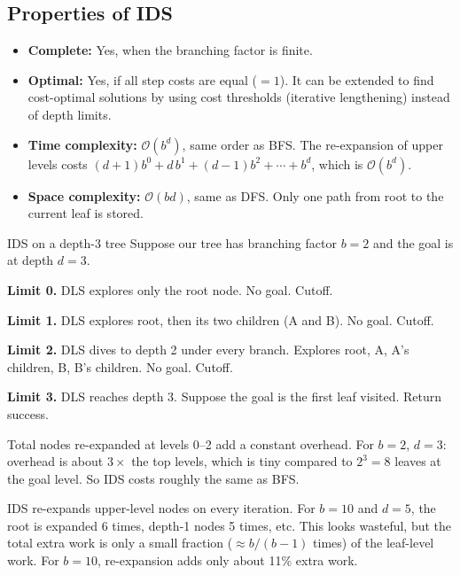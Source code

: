 \documentclass[a4paper,11pt]{article}
\begin{document}
\subsection*{Properties of IDS}

\begin{itemize}
  \item \textbf{Complete:} Yes, when the branching factor is finite.
  \item \textbf{Optimal:} Yes, if all step costs are equal ($=1$). It can be
    extended to find cost-optimal solutions by using cost thresholds
    (iterative lengthening) instead of depth limits.
  \item \textbf{Time complexity:} $\mathcal{O}(b^{d})$, same order as BFS.
    The re-expansion of upper levels costs
    $(d+1)b^{0} + d\,b^{1} + (d-1)b^{2} + \cdots + b^{d}$, which is
    $\mathcal{O}(b^{d})$.
  \item \textbf{Space complexity:} $\mathcal{O}(bd)$, same as DFS. Only one
    path from root to the current leaf is stored.
\end{itemize}

\begin{worked}{IDS on a depth-3 tree}
Suppose our tree has branching factor $b=2$ and the goal is at depth $d=3$.
\begin{steps}
  \item \textbf{Limit 0.} DLS explores only the root node. No goal. Cutoff.
  \item \textbf{Limit 1.} DLS explores root, then its two children (A and B).
    No goal. Cutoff.
  \item \textbf{Limit 2.} DLS dives to depth 2 under every branch. Explores
    root, A, A's children, B, B's children. No goal. Cutoff.
  \item \textbf{Limit 3.} DLS reaches depth 3. Suppose the goal is the first
    leaf visited. Return success.
\end{steps}
Total nodes re-expanded at levels 0--2 add a constant overhead. For $b=2$,
$d=3$: overhead is about $3 \times$ the top levels, which is tiny compared to
$2^{3}=8$ leaves at the goal level. So IDS costs roughly the same as BFS.
\end{worked}

\begin{watchout}
IDS re-expands upper-level nodes on every iteration. For $b=10$ and $d=5$,
the root is expanded 6 times, depth-1 nodes 5 times, etc. This looks
wasteful, but the total extra work is only a small fraction ($\approx b/(b-1)$
times) of the leaf-level work. For $b=10$, re-expansion adds only about 11\%
extra work.
\end{watchout}
\end{document}
